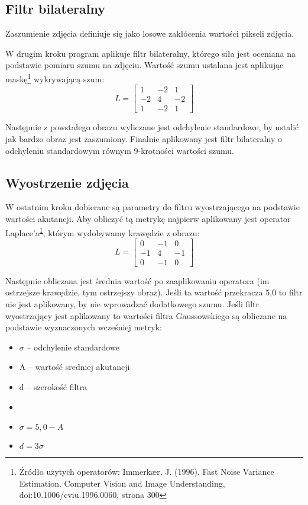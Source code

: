 \documentclass[]{mwart}
\begin{document}
\subsection{Filtr bilateralny}
Zaszumienie zdjęcia definiuje się jako losowe zakłócenia wartości pikseli zdjęcia.

W drugim kroku program aplikuje filtr bilateralny,
którego siła jest oceniana na podstawie pomiaru szumu na zdjęciu.
Wartość szumu ustalana jest aplikując maskę\footnote{\label{przyp1} Źródło użytych operatorów: Immerkær, J. (1996). Fast Noise Variance Estimation. Computer Vision and Image Understanding, doi:10.1006/cviu.1996.0060, strona 300 }
wykrywającą szum:
\[  L = \begin{bmatrix}
        1  & -2 & 1  \\
        -2 & 4  & -2 \\
        1  & -2 & 1
    \end{bmatrix}   \]

Następnie z powstałego obrazu wyliczane jest odchylenie standardowe,
by ustalić jak bardzo obraz jest zaszumiony. Finalnie aplikowany jest
filtr bilateralny o odchyleniu standardowym równym 9-krotności
wartości szumu.

\subsection{Wyostrzenie zdjęcia}
W ostatnim kroku dobierane są parametry do filtru wyostrzającego
na podstawie wartości akutancji.
Aby obliczyć tą metrykę najpierw aplikowany jest operator Laplace'a\textsuperscript{\ref{przyp1}},
którym wydobywamy krawędzie z obrazu:
\[  L = \begin{bmatrix}
        0  & -1 & 0  \\
        -1 & 4  & -1 \\
        0  & -1 & 0
    \end{bmatrix}\]

Następnie obliczana jest średnia wartość po zaaplikowaniu operatora
(im ostrzejsze krawędzie, tym ostrzejszy obraz).
Jeśli ta wartość przekracza 5,0 to filtr nie jest aplikowany,
by nie wprowadzać dodatkowego szumu.
Jeśli filtr wyostrzający jest aplikowany to wartości filtra
Gaussowskiego są obliczane na podstawie wyznaczonych wcześniej metryk:
\begin{itemize}[label={}, leftmargin=*]
    \item $\sigma$ -- odchylenie standardowe
    \item A -- wartość sredniej akutancji
    \item d -- szerokość filtra
    \item
    \item $\sigma = 5,0 - A$
    \item $d = 3 \sigma$
\end{itemize}
\end{document}
